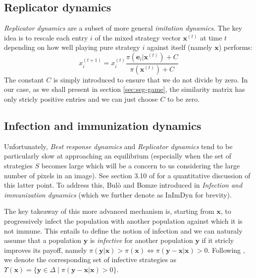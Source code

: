 \documentclass[11pt,a4paper]{article}
\begin{document}
\subsection*{Replicator dynamics}
\textit{Replicator dynamics} are a subset of more general \textit{imitation dynamics}. The key idea is to rescale each entry $i$ of the mixed strategy vector $\mathbf{x}^{(t)}$ at time $t$ depending on how well playing pure strategy $i$ against itself (namely $\mathbf{x}$) performs:
\begin{equation}
    \label{eq:replicator-dynamics}
    x_i^{(t+1)} = x_i^{(t)}\frac{\pi(\mathbf{e}_i|\mathbf{x}^{(t)}) + C}{\pi(\mathbf{x}^{(t)}) + C}
\end{equation}
The constant $C$ is simply introduced to ensure that we do not divide by zero. In our case, as we shall present in section \ref{sec:seg-game}, the similarity matrix has only stricly positive entries and we can just choose $C$ to be zero.

\subsection*{Infection and immunization dynamics}
Unfortunately, \textit{Best response dynamics} and \textit{Replicator dynamics} tend to be particularly slow at approaching an equilibrium (especially when the set of strategies $S$ becomes large which will be a concern to us considering the large number of pixels in an image). See section 3.10 of \cite{bulo-thesis} for a quantitative discussion of this latter point. To address this, Bulò and Bomze introduced in \cite{inimdyn} \textit{Infection and immunization dynamics} (which we further denote as InImDyn for brevity).   

The key takeaway of this more advanced mechanism is, starting from $\mathbf{x}$, to progressively infect the population with another population against which it is not immune. This entails to define the notion of infection and we can naturaly assume that a population $\mathbf{y}$ is \textit{infective} for another population $\mathbf{y}$ if it stricly improves its payoff, namely $\pi(\mathbf{y}|\mathbf{x})>\pi(\mathbf{x})\iff\pi(\mathbf{y}-\mathbf{x}|\mathbf{x})>0$. Following \cite{bulo-thesis}, we denote the corresponding set of infective strategies as $\Upsilon(\mathbf{x})=\{\mathbf{y}\in\Delta\; |\; \pi(\mathbf{y}-\mathbf{x}|\mathbf{x})>0\}$.
\end{document}
